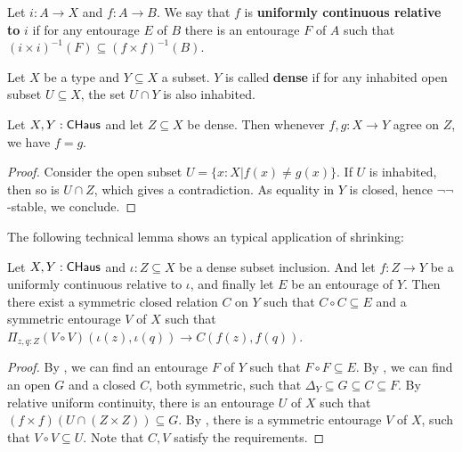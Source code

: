 \begin{definition}
  Let $i:A \to X$ and $f:A \to B$. We say that $f$ is \textbf{uniformly continuous relative to} $i$ if for any entourage $E$ of $B$ there is an entourage $F$ of $A$ such that $(i\times i)^{-1}(F) \subseteq (f \times f)^{-1}(B)$. 
\end{definition}
\begin{definition}
  Let $X$ be a type and $Y\subseteq X$ a subset. $Y$ is called \textbf{dense} if for any inhabited open subset $U\subseteq X$, the set $U \cap Y$ is also inhabited. 
\end{definition}
\begin{lemma}\label{ExtensionUnique}
  Let $X,Y:\mathsf{CHaus}$ and let $Z \subseteq X$ be dense. Then whenever $f,g:X \to Y$ agree on $Z$, we have $f = g$.
\end{lemma}
\begin{proof}
 Consider the open subset $U = \{x:X | f(x) \neq g(x)\}$. If $U$ is inhabited, then so is $U \cap Z$, which gives a contradiction. As equality in $Y$ is closed, hence $\neg\neg$-stable, we conclude. 
\end{proof}
The following technical lemma shows an typical application of shrinking:
\begin{lemma}\label{technicalExtension}
  Let $X,Y:\mathsf{CHaus}$ and $\iota: Z\subseteq X$ be a dense subset inclusion. And let $f:Z\to Y$ be a uniformly continuous relative to $\iota$, and finally let $E$ be an entourage of $Y$. 
  Then there exist a symmetric closed relation $C$ on $Y$ such that $C\circ C\subseteq E$ and a symmetric entourage $V$ of $X$ such that $\Pi_{z,q:Z} (V \circ V)(\iota(z),\iota(q)) \to C (f(z),f(q))$. 
\end{lemma}
\begin{proof}
  By , we can find an entourage $F$ of $Y$ such that $F \circ F \subseteq E$. By , we can find an open $G$ and a closed $C$, both symmetric, such that $\Delta_Y \subseteq G \subseteq C \subseteq F$. %
  By relative uniform continuity, there is an entourage $U$ of $X$ such that $(f \times f)\left(U \cap \left(Z \times Z\right)\right) \subseteq G$. By , there is a symmetric entourage $V$ of $X$, such that $V\circ V \subseteq U$. 
  Note that $C,V$ satisfy the requirements. 
\end{proof}

